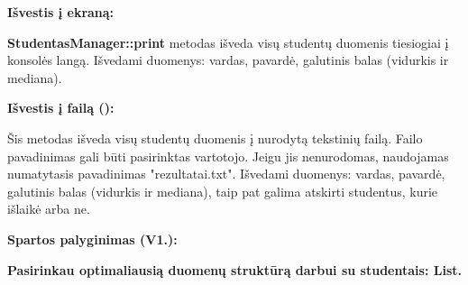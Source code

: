 \begin{DoxyItemize}
\item {\bfseries{Išvestis į ekraną\+:}}
\begin{DoxyItemize}
\item {\bfseries{Studentas\+Manager\+::print}} metodas išveda visų studentų duomenis tiesiogiai į konsolės langą. Išvedami duomenys\+: vardas, pavardė, galutinis balas (vidurkis ir mediana).
\end{DoxyItemize}
\item {\bfseries{Išvestis į failą ()\+:}}
\begin{DoxyItemize}
\item Šis metodas išveda visų studentų duomenis į nurodytą tekstinių failą. Failo pavadinimas gali būti pasirinktas vartotojo. Jeigu jis nenurodomas, naudojamas numatytasis pavadinimas "{}rezultatai.\+txt"{}. Išvedami duomenys\+: vardas, pavardė, galutinis balas (vidurkis ir mediana), taip pat galima atskirti studentus, kurie išlaikė arba ne.
\end{DoxyItemize}
\end{DoxyItemize}



{\bfseries{Spartos palyginimas (V1.)\+:}}

{\bfseries{Pasirinkau optimaliausią duomenų struktūrą darbui su studentais\+: List.}}


